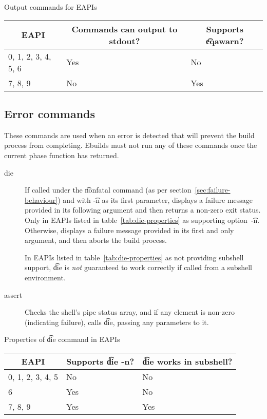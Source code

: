 \begin{centertable}{Output commands for EAPIs}
    \label{tab:output-commands}
    \begin{tabular}{lll}
      \toprule
      \multicolumn{1}{c}{\textbf{EAPI}} &
      \multicolumn{1}{c}{\textbf{Commands can output to stdout?}} &
      \multicolumn{1}{c}{\textbf{Supports \t{eqawarn}?}} \\
      \midrule
      0, 1, 2, 3, 4, 5, 6 & Yes & No  \\
      7, 8, 9             & No  & Yes \\
      \bottomrule
    \end{tabular}
\end{centertable}

\subsection{Error commands}
These commands are used when an error is detected that will prevent the build process from
completing. Ebuilds must not run any of these commands once the current phase function has returned.
\begin{description}
\item[die]  If called under the \t{nonfatal} command (as per
    section~\ref{sec:failure-behaviour}) and with \t{-n} as its first parameter, displays a failure
    message provided in its following argument and then returns a non-zero exit status. Only in
    EAPIs listed in table~\ref{tab:die-properties} as supporting option~\t{-n}. Otherwise, displays
    a failure message provided in its first and only argument, and then aborts the build process.

     In EAPIs listed in table~\ref{tab:die-properties} as not providing
    subshell support, \t{die} is \emph{not} guaranteed to work correctly if called from a subshell
    environment.
\item[assert] Checks the shell's pipe status array, and if any element is non-zero (indicating
    failure), calls \t{die}, passing any parameters to it.
\end{description}

\begin{centertable}{Properties of \t{die} command in EAPIs}
    \label{tab:die-properties}
    \begin{tabular}{lll}
      \toprule
      \multicolumn{1}{c}{\textbf{EAPI}} &
      \multicolumn{1}{c}{\textbf{Supports \t{die -n}?}} &
      \multicolumn{1}{c}{\textbf{\t{die} works in subshell?}} \\
      \midrule
      0, 1, 2, 3, 4, 5  & No  & No  \\
      6                 & Yes & No  \\
      7, 8, 9           & Yes & Yes \\
      \bottomrule
    \end{tabular}
\end{centertable}

